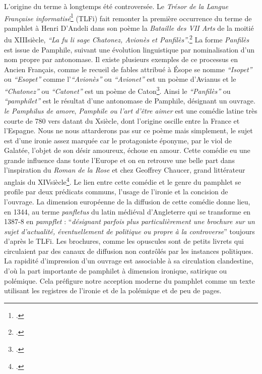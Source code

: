 L'origine du terme à longtemps été controversée. Le \textit{Trésor de la Langue Française informatisé}\footcites{noauthor_tlfi_nodate} (TLFi) fait remonter la première occurrence du terme de pamphlet à Henri D'Andeli dans son poème la \textit{Bataille des VII Arts} de la moitié du XIII\ieme siècle, \textit{\enquote{La fu li sage Chatonez, Avionès et Panfilès}}.\footcites{henri_dandeli_oeuvres_1881} La forme \textit{Panfilès} est issue de Pamphile, suivant une évolution linguistique par nominalisation d'un nom propre par antonomase. Il existe plusieurs exemples de ce processus en Ancien Français, comme le recueil de fables attribué à Ésope se nomme \textit{\enquote{Isopet}} ou \textit{\enquote{Esopet}} comme l'\textit{\enquote{Avionès}} ou \textit{\enquote{Avionet}} est un poème d'Avianus et le \textit{\enquote{Chatonez}} ou \textit{\enquote{Catonet}} est un poème de Caton\footcites{morawski_pamphile_1917}. Ainsi le \textit{\enquote{Panfilès}} ou \textit{\enquote{pamphilet}} est le résultat d'une antonomase de Pamphile, désignant un ouvrage. \textit{le Pamphilus de amore}, \textit{Pamphile ou l'art d'être aimer} est une comédie latine très courte de 780 vers datant du X\ieme siècle, dont l'origine oscille entre la France et l'Espagne. Nous ne nous attarderons pas sur ce poème mais simplement, le sujet est d'une ironie assez marquée car le protagoniste éponyme, par le viol de Galatée, l'objet de son désir amoureux, échoue en amour. Cette comédie eu une grande influence dans toute l'Europe et on en retrouve une belle part dans l'inspiration du \textit{Roman de la Rose} et chez Geoffrey Chaucer, grand littérateur anglais du XIV\ieme siècle\footcites{morawski_pamphile_1917}. Le lien entre cette comédie et le genre du pamphlet se profile par deux prédicats communs, l'usage de l'ironie et la concision de l'ouvrage. La dimension européenne de la diffusion de cette comédie donne lieu, en 1344, au terme \textit{panfletus} du latin médiéval d'Angleterre qui se transforme en 1387-8 en \textit{pampflet} : \enquote{\textit{désignant parfois plus particulièrement une brochure sur un sujet d'actualité, éventuellement de politique ou propre à la controverse}} toujours d'après le TLFi. Les brochures, comme les opuscules sont de petits livrets qui circulaient par des canaux de diffusion non contrôlés par les instances politiques. La rapidité d'impression d'un ouvrage est associable à sa circulation clandestine, d'où la part importante de pamphilet à dimension ironique, satirique ou polémique. Cela préfigure notre acception moderne du pamphlet comme un texte utilisant les registres de l'ironie et de la polémique et de peu de pages.

